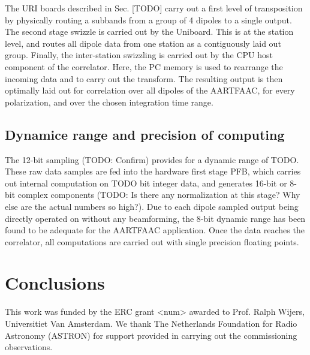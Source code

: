 \documentclass{aa}
\begin{document}
The  URI  boards  described  in  Sec.    [TODO]  carry  out  a  first  level  of
transposition by physically  routing a subbands from  a group of 4  dipoles to a
single output. The second stage swizzle is  carried out by the Uniboard. This is
at  the  station level,  and  routes  all dipole  data  from  one station  as  a
contiguously laid out group. Finally, the inter-station swizzling is carried out
by the  CPU host component  of the  correlator. Here, the  PC memory is  used to
rearrange the incoming data and to carry out the transform. The resulting output
is then optimally laid out for correlation over all dipoles of the AARTFAAC, for
every polarization, and over the chosen integration time range.

\subsection {Dynamice range and precision of computing}
The 12-bit sampling (TODO: Confirm) provides  for a dynamic range of TODO. These
raw data samples  are fed into the  hardware first stage PFB,  which carries out
internal computation  on TODO bit  integer data,  and generates 16-bit  or 8-bit
complex components (TODO: Is there any normalization at this stage? Why else are
the actual numbers  so high?). Due to each dipole  sampled output being directly
operated on without  any beamforming, the 8-bit dynamic range  has been found to
be adequate for the AARTFAAC application.  Once the data reaches the correlator,
all computations are carried out with single precision floating points.

\section {\label{sec:conclusion} Conclusions}

\begin {acknowledgements}

This work  was funded  by the ERC  grant <num> awarded  to Prof.   Ralph Wijers,
Universitiet  Van Amsterdam.   We  thank The  Netherlands  Foundation for  Radio
Astronomy  (ASTRON)  for support  provided  in  carrying out  the  commissioning
observations.
\end{acknowledgements}


\end{document}
